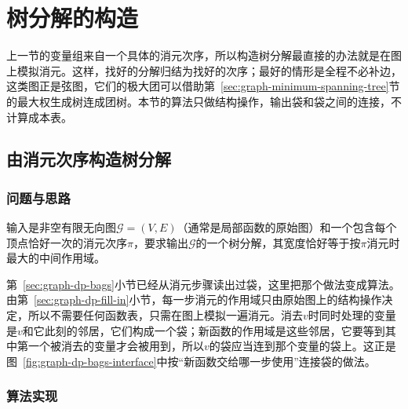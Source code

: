 
\section{树分解的构造}
\label{sec:graph-tree-decomposition-construction}

上一节的变量组来自一个具体的消元次序，所以构造树分解最直接的办法就是在图上模拟消元。这样，找好的分解归结为找好的次序；最好的情形是全程不必补边，这类图正是弦图，它们的极大团可以借助第~\ref{sec:graph-minimum-spanning-tree}节的最大权生成树连成团树。本节的算法只做结构操作，输出袋和袋之间的连接，不计算成本表。

\subsection{由消元次序构造树分解}
\label{sec:graph-dp-order-to-decomposition}

\subsubsection{问题与思路}

输入是非空有限无向图$\mathcal G=(V,E)$（通常是局部函数的原始图）和一个包含每个顶点恰好一次的消元次序$\pi$，要求输出$\mathcal G$的一个树分解，其宽度恰好等于按$\pi$消元时最大的中间作用域。

第~\ref{sec:graph-dp-bags}小节已经从消元步骤读出过袋，这里把那个做法变成算法。由第~\ref{sec:graph-dp-fill-in}小节，每一步消元的作用域只由原始图上的结构操作决定，所以不需要任何函数表，只需在图上模拟一遍消元。消去$v$时同时处理的变量是$v$和它此刻的邻居，它们构成一个袋；新函数的作用域是这些邻居，它要等到其中第一个被消去的变量才会被用到，所以$v$的袋应当连到那个变量的袋上。这正是图~\ref{fig:graph-dp-bags-interface}中按“新函数交给哪一步使用”连接袋的做法。

\subsubsection{算法实现}

